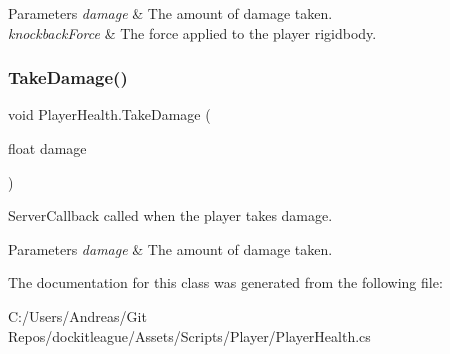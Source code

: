 \begin{DoxyParams}{Parameters}
{\em damage} & The amount of damage taken.\\
\hline
{\em knockback\+Force} & The force applied to the player rigidbody.\\
\hline
\end{DoxyParams}
\hypertarget{class_player_health_a92faabb0dfe53cdbdd4ba7ab2b51b6dc}{}\label{class_player_health_a92faabb0dfe53cdbdd4ba7ab2b51b6dc} 
\subsubsection{\texorpdfstring{Take\+Damage()}{TakeDamage()}\hspace{0.1cm}{\footnotesize\ttfamily [2/2]}}
{\footnotesize\ttfamily void Player\+Health.\+Take\+Damage (\begin{DoxyParamCaption}\item[{float}]{damage }\end{DoxyParamCaption})}



Server\+Callback called when the player takes damage. 


\begin{DoxyParams}{Parameters}
{\em damage} & The amount of damage taken.\\
\hline
\end{DoxyParams}


The documentation for this class was generated from the following file\+:\begin{DoxyCompactItemize}
\item 
C\+:/\+Users/\+Andreas/\+Git Repos/dockitleague/\+Assets/\+Scripts/\+Player/Player\+Health.\+cs\end{DoxyCompactItemize}
